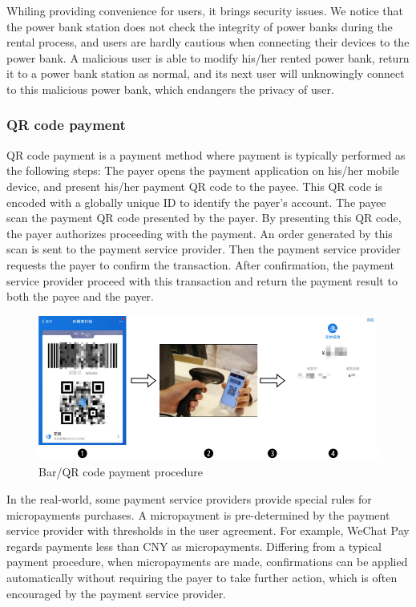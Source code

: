 
Whiling providing convenience for users, it brings security issues. We notice that the power bank station does not check the integrity of power banks during the rental process, and users are hardly cautious when connecting their devices to the power bank. A malicious user is able to modify his/her rented power bank, return it to a power bank station as normal, and its next user will unknowingly connect to this malicious power bank, which endangers the privacy of user.

\subsubsection{QR code payment}

QR code payment is a payment method where payment is typically performed as the following steps:
 The payer opens the payment application on his/her mobile device, and present his/her payment QR code to the payee. This QR code is encoded with a globally unique ID to identify the payer's account. 
 The payee scan the payment QR code presented by the payer. By presenting this QR code, the payer authorizes proceeding with the payment.
 An order generated by this scan is sent to the payment service provider. Then the payment service provider requests the payer to confirm the transaction.
 After confirmation, the payment service provider proceed with this transaction and return the payment result to both the payee and the payer.


\begin{figure}[hbtp]
	\centering
	\includegraphics[width=\linewidth]{./Figs/qr_code_payment.png}
	\caption{Bar/QR code payment procedure}
	\label{fig:qr_payment_procedure}
\end{figure}


In the real-world, some payment service providers provide special rules for micropayments purchases. A micropayment is pre-determined by the payment service provider with thresholds in the user agreement. For example, WeChat Pay regards payments less than CNY  as micropayments. Differing from a typical payment procedure, when micropayments are made, confirmations can be applied automatically without requiring the payer to take further action, which is often encouraged by the payment service provider.

